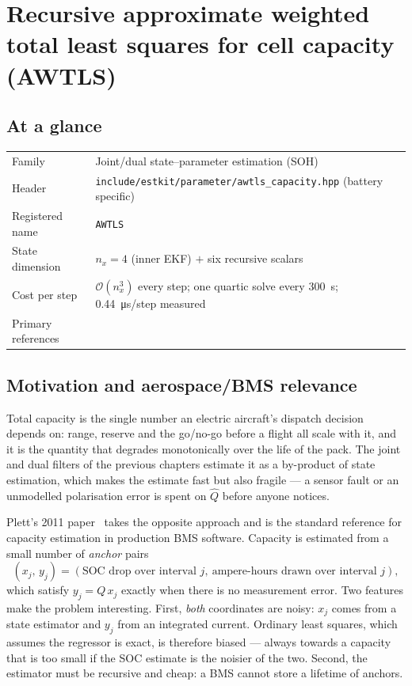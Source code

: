 \chapter{Recursive approximate weighted total least squares for cell capacity (AWTLS)}
\label{ch:awtls}

\section*{At a glance}
\begin{tabular}{@{}l>{\raggedright\arraybackslash}p{}@{}}
Family & Joint/dual state--parameter estimation (SOH) \\
Header & \texttt{include/estkit/parameter/awtls\_capacity.hpp} (battery specific) \\
Registered name & \texttt{AWTLS} \\
State dimension & $n_x=4$ (inner EKF) $+$ six recursive scalars \\
Cost per step & $\mathcal{O}(n_x^3)$ every step; one quartic solve every \SI{300}{\second}; \SI{0.44}{\micro\second}/step measured \\
Primary references & \cite{plett2011awtls,plett2016bms2,zhao2017observability,golubvanloan2013} \\
\end{tabular}

\section{Motivation and aerospace/BMS relevance}
Total capacity is the single number an electric aircraft's dispatch decision depends on: range,
reserve and the go/no-go before a flight all scale with it, and it is the quantity that degrades
monotonically over the life of the pack.  The joint and dual filters of the previous chapters
estimate it as a by-product of state estimation, which makes the estimate fast but also fragile ---
a sensor fault or an unmodelled polarisation error is spent on $\hat Q$ before anyone notices.

Plett's 2011 paper~\cite{plett2011awtls} takes the opposite approach and is the standard reference
for capacity estimation in production BMS software.  Capacity is estimated from a small number of
\emph{anchor} pairs
\begin{equation}
\left(x_j,\,y_j\right) = \left(\text{SOC drop over interval }j,\ \text{ampere-hours drawn over interval }j\right),
\label{eq:aw-anchor}
\end{equation}
which satisfy $y_j=Q\,x_j$ exactly when there is no measurement error.  Two features make the
problem interesting.  First, \emph{both} coordinates are noisy: $x_j$ comes from a state estimator
and $y_j$ from an integrated current.  Ordinary least squares, which assumes the regressor is exact,
is therefore biased --- always towards a capacity that is too small if the SOC estimate is the
noisier of the two.  Second, the estimator must be recursive and cheap: a BMS cannot store a
lifetime of anchors.

